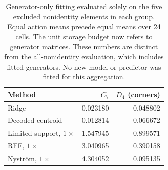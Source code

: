 \begin{table}[htbp]\centering\small
\begin{tabular}{lrr}\toprule
Method & $C_7$ & $D_4$ (corners) \\
\midrule
Ridge & 0.023180 & 0.048802 \\
Decoded centroid & 0.012814 & 0.066672 \\
Limited support, $1\times$ & 1.547945 & 0.899571 \\
RFF, $1\times$ & 3.040965 & 0.390158 \\
Nystr\"om, $1\times$ & 4.304052 & 0.095135 \\
\bottomrule\end{tabular}
\caption{Generator-only fitting evaluated solely on the five excluded nonidentity elements in each group. Equal action means precede equal means over 24 cells. The unit storage budget now refers to generator matrices. These numbers are distinct from the all-nonidentity evaluation, which includes fitted generators. No new model or predictor was fitted for this aggregation.}
\label{tab:reproduction-unseen}\end{table}
